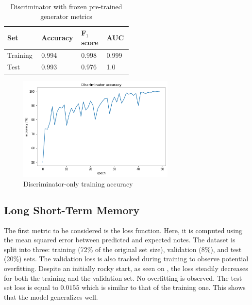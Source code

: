 \documentclass[a4paper, 11pt, twoside]{report}
\theoremstyle{definition}
\begin{document}
\begin{table}[H]
    \centering
    \caption{Discriminator with frozen pre-trained generator metrics} \vskip16pt
    \label{tab:disc-metrics}
    \begin{tabular}{ |P{0.18\linewidth}|P{0.11\linewidth}|P{0.11\linewidth}|P{0.11\linewidth}| }
        \hline
        \small Set & \small Accuracy & \small F$_1$ score & \small AUC \\
        \hline
        Training   & 0.994           & 0.998              & 0.999      \\
        \hline
        Test       & 0.993           & 0.976              & 1.0        \\
        \hline
    \end{tabular}
\end{table}

\begin{figure}[H]
    \centering
    \includegraphics[width=0.7\textwidth]{assets/discriminator_acc.png}
    \caption{Discriminator-only training accuracy}
    \label{fig:disc-acc}
\end{figure}

\subsection{Long Short-Term Memory}

The first metric to be considered is the loss function. Here, it is computed using the mean squared error between predicted and expected notes. The dataset is split into three: training (72\% of the original set size), validation (8\%), and test (20\%) sets. The validation loss is also tracked during training to observe potential overfitting. Despite an initially rocky start, as seen on , the loss steadily decreases for both the training and the validation set. No overfitting is observed. The test set loss is equal to $0.0155$ which is similar to that of the training one. This shows that the model generalizes well. \par
\end{document}
